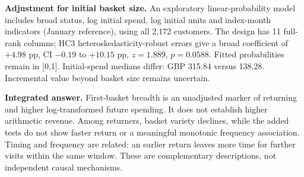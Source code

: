 \documentclass[10pt,a4paper,twocolumn]{article}
\begin{document}
\textbf{Adjustment for initial basket size.} An exploratory linear-probability model includes broad status, log initial spend, log initial units and index-month indicators (January reference), using all 2,172 customers. The design has 11 full-rank columns; HC3 heteroskedasticity-robust errors give a broad coefficient of $+4.98$ pp, CI $-0.19$ to $+10.15$ pp, $z=1.889$, $p=0.0588$. Fitted probabilities remain in [0,1]. Initial-spend medians differ: GBP 315.84 versus 138.28. Incremental value beyond basket size remains uncertain.

\textbf{Integrated answer.} First-basket breadth is an unadjusted marker of returning and higher log-transformed future spending. It does not establish higher arithmetic revenue. Among returners, basket variety declines, while the added tests do not show faster return or a meaningful monotonic frequency association. Timing and frequency are related: an earlier return leaves more time for further visits within the same window. These are complementary descriptions, not independent causal mechanisms.
\end{document}
